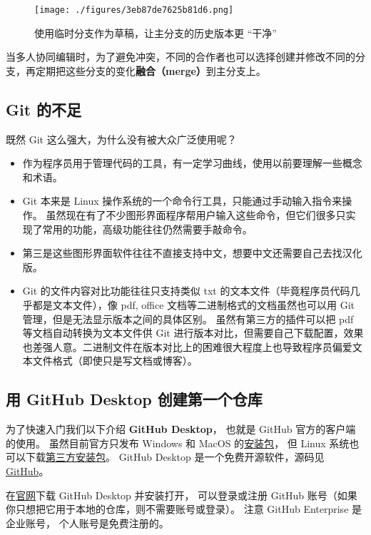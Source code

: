 \begin{figure}[ht]
\centering
\texttt{[image: ./figures/3eb87de7625b81d6.png]}
\caption{使用临时分支作为草稿，让主分支的历史版本更 “干净”} \label{fig_GitHub_6}
\end{figure}

当多人协同编辑时，为了避免冲突，不同的合作者也可以选择创建并修改不同的分支，再定期把这些分支的变化\textbf{融合（merge）}到主分支上。

\subsection{Git 的不足}
既然 Git 这么强大，为什么没有被大众广泛使用呢？
\begin{itemize}
\item 作为程序员用于管理代码的工具，有一定学习曲线，使用以前要理解一些概念和术语。
\item Git 本来是 Linux 操作系统的一个命令行工具，只能通过手动输入指令来操作。 虽然现在有了不少图形界面程序帮用户输入这些命令，但它们很多只实现了常用的功能，高级功能往往仍然需要手敲命令。
\item 第三是这些图形界面软件往往不直接支持中文，想要中文还需要自己去找汉化版。
\item Git 的文件内容对比功能往往只支持类似 txt 的文本文件（毕竟程序员代码几乎都是文本文件），像 pdf, office 文档等二进制格式的文档虽然也可以用 Git 管理，但是无法显示版本之间的具体区别。 虽然有第三方的插件可以把 pdf 等文档自动转换为文本文件供 Git 进行版本对比，但需要自己下载配置，效果也差强人意。二进制文件在版本对比上的困难很大程度上也导致程序员偏爱文本文件格式（即使只是写文档或博客）。
\end{itemize}

\subsection{用 GitHub Desktop 创建第一个仓库}
为了快速入门我们以下介绍 \textbf{GitHub Desktop}， 也就是 GitHub 官方的客户端的使用。 虽然目前官方只发布 Windows 和 MacOS 的\href{https://desktop.github.com/}{安装包}， 但 Linux 系统也可以下载\href{https://github.com/shiftkey/desktop/releases}{第三方安装包}。 GitHub Desktop 是一个免费开源软件，源码见 \href{https://github.com/desktop/desktop}{GitHub}。

在\href{https://desktop.github.com/}{官网}下载 GitHub Desktop 并安装打开， 可以登录或注册 GitHub 账号（如果你只想把它用于本地的仓库，则不需要账号或登录）。 注意 GitHub Enterprise 是企业账号， 个人账号是免费注册的。

